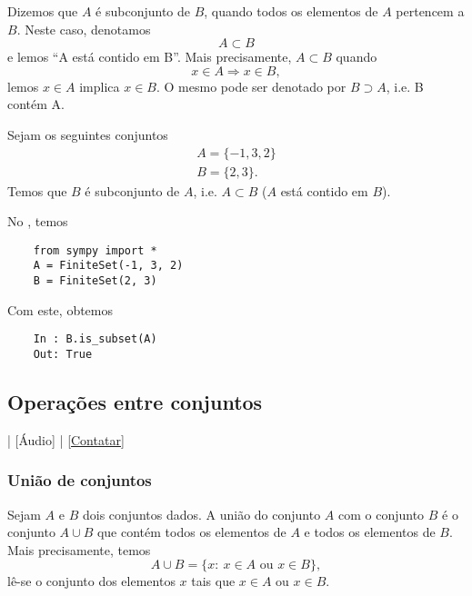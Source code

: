 Dizemos que $A$ é subconjunto de $B$, quando todos os elementos de $A$ pertencem a $B$. Neste caso, denotamos
\begin{equation}
  A \subset B
\end{equation}
e lemos ``A está contido em B''. Mais precisamente, $A\subset B$ quando
\begin{equation}
  x\in A \Rightarrow x\in B,
\end{equation}
lemos $x\in A$ implica $x\in B$. O mesmo pode ser denotado por $B\supset A$, i.e. B contém A.

\begin{ex}
  Sejam os seguintes conjuntos
  \begin{gather}
    A = \{-1, 3, 2\}\\
    B = \{2, 3\}.
  \end{gather}
  Temos que $B$ é subconjunto de $A$, i.e. $A\subset B$ ($A$ está contido em $B$).
    
  \ifispython
  No \python, temos
  \begin{lstlisting}
    from sympy import *
    A = FiniteSet(-1, 3, 2)
    B = FiniteSet(2, 3)
  \end{lstlisting}
  Com este, obtemos
  \begin{lstlisting}
    In : B.is_subset(A)
    Out: True
  \end{lstlisting}
  \fi
\end{ex}

\subsection{Operações entre conjuntos}

\begin{flushright}
  [Vídeo] | [Áudio] | \href{https://phkonzen.github.io/notas/contato.html}{[Contatar]}
\end{flushright}

\subsubsection{União de conjuntos}

Sejam $A$ e $B$ dois conjuntos dados. A união do conjunto $A$ com o conjunto $B$ é o conjunto $A\cup B$ que contém todos os elementos de $A$ e todos os elementos de $B$. Mais precisamente, temos
\begin{equation}
  A\cup B = \{x:~x\in A \text{ ou } x\in B\},
\end{equation}
lê-se o conjunto dos elementos $x$ tais que $x\in A$ ou $x\in B$.

